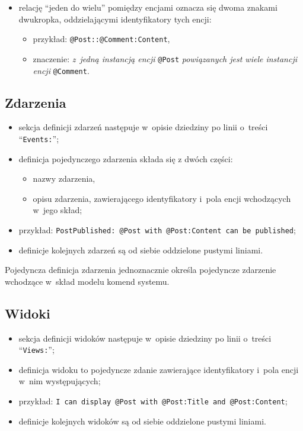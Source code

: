 \begin{itemize}
 \item relację ``jeden do wielu'' pomiędzy encjami oznacza się dwoma znakami dwukropka, oddzielającymi identyfikatory tych encji:
  \begin{itemize}
   \item przykład: \verb|@Post::@Comment:Content|,
   \item znaczenie: \emph{z~jedną instancją encji} \verb|@Post| \emph{powiązanych jest wiele instancji encji} \verb|@Comment|.
  \end{itemize}
\end{itemize}


\subsection{Zdarzenia}

\begin{itemize}
 \item sekcja definicji zdarzeń następuje w~opisie dziedziny po linii o~treści ``\verb|Events:|'';
 \item definicja pojedynczego zdarzenia składa się z dwóch części:
  \begin{itemize}
   \item nazwy zdarzenia,
   \item opisu zdarzenia, zawierającego identyfikatory i~pola encji wchodzących w~jego skład;
  \end{itemize}
 \item przykład: \verb|PostPublished: @Post with @Post:Content can be published|;
 \item definicje kolejnych zdarzeń są od siebie oddzielone pustymi liniami.
\end{itemize}

Pojedyncza definicja zdarzenia jednoznacznie określa pojedyncze zdarzenie wchodzące w~skład modelu komend systemu.


\subsection{Widoki}

\begin{itemize}
 \item sekcja definicji widoków następuje w~opisie dziedziny po linii o~treści ``\verb|Views:|'';
 \item definicja widoku to pojedyncze zdanie zawierające identyfikatory i~pola encji w~nim występujących;
 \item przykład: \verb|I can display @Post with @Post:Title and @Post:Content|;
 \item definicje kolejnych widoków są od siebie oddzielone pustymi liniami.
\end{itemize}

